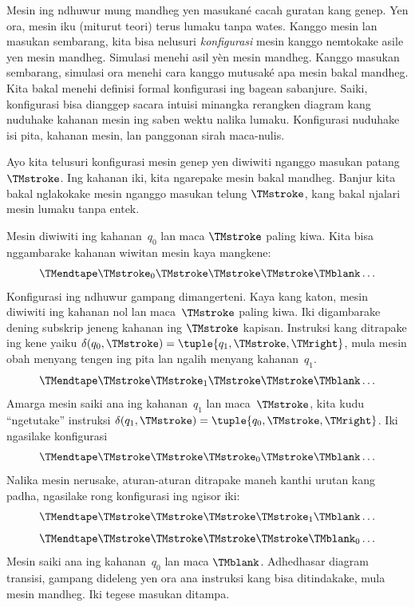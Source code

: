 \documentclass[../../../include/open-logic-section]{subfiles}
\begin{document}
\begin{explain}
Mesin ing ndhuwur mung mandheg yen masukané
cacah guratan kang genep. Yen ora,
mesin iku (miturut teori) terus lumaku
tanpa wates. Kanggo mesin lan masukan
sembarang, kita bisa nelusuri
\emph{konfigurasi} mesin kanggo nemtokake
asile yen mesin mandheg. Simulasi menehi asil yèn mesin mandheg. Kanggo masukan sembarang, simulasi ora menehi cara kanggo mutusaké apa mesin bakal mandheg. Kita bakal menehi definisi formal
konfigurasi ing bagean sabanjure. Saiki,
konfigurasi bisa dianggep sacara intuisi
minangka rerangken diagram kang nuduhake
kahanan mesin ing saben wektu nalika lumaku.
Konfigurasi nuduhake isi pita, kahanan mesin,
lan panggonan sirah maca-nulis.

Ayo kita telusuri konfigurasi mesin genep
yen diwiwiti nganggo masukan patang
$\TMstroke$. Ing kahanan iki, kita ngarepake
mesin bakal mandheg. Banjur kita bakal
nglakokake mesin nganggo masukan telung
$\TMstroke$, kang bakal njalari mesin
lumaku tanpa entek.

Mesin diwiwiti ing kahanan~$q_0$ lan maca
$\TMstroke$ paling kiwa. Kita bisa
nggambarake kahanan wiwitan mesin kaya mangkene:
\[
\TMendtape \TMstroke_0 \TMstroke \TMstroke \TMstroke \TMblank \ldots
\]
%
Konfigurasi ing ndhuwur gampang dimangerteni.
 Kaya kang katon, mesin diwiwiti ing kahanan
nol lan maca~$\TMstroke$ paling kiwa.
Iki digambarake dening subskrip jeneng
kahanan ing $\TMstroke$ kapisan.
Instruksi kang ditrapake ing kene yaiku
$\delta(q_0, \TMstroke) = \tuple{q_1, \TMstroke, \TMright}$,
mula mesin obah menyang tengen ing pita lan
ngalih menyang kahanan~$q_1$.
\[
\TMendtape \TMstroke \TMstroke_1 \TMstroke \TMstroke \TMblank \ldots
\]
Amarga mesin saiki ana ing kahanan~$q_1$
lan maca~$\TMstroke$, kita kudu
``ngetutake'' instruksi $\delta(q_1, \TMstroke) = \tuple{q_0,
  \TMstroke, \TMright}$. Iki ngasilake konfigurasi
\[
\TMendtape \TMstroke \TMstroke \TMstroke_0 \TMstroke \TMblank \ldots
\]
Nalika mesin nerusake, aturan-aturan ditrapake
maneh kanthi urutan kang padha, ngasilake
rong konfigurasi ing ngisor iki:
\[
\TMendtape \TMstroke \TMstroke \TMstroke \TMstroke_1 \TMblank \ldots
\]
\[
\TMendtape \TMstroke \TMstroke \TMstroke \TMstroke \TMblank_0 \ldots
\]
Mesin saiki ana ing kahanan~$q_0$ lan maca
$\TMblank$. Adhedhasar diagram transisi,
gampang dideleng yen ora ana instruksi
kang bisa ditindakake, mula mesin mandheg.
Iki tegese masukan ditampa.


\end{explain}
\end{document}
